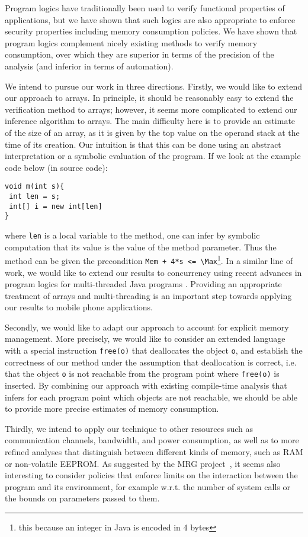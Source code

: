 
Program logics have traditionally been used to verify functional
properties of applications, but we have shown that such logics 
are also appropriate to enforce security properties including
memory consumption policies. We have shown that program logics
complement nicely existing methods to verify memory consumption,
over which they are superior in terms of the precision of the
analysis (and inferior in terms of automation).


We intend to pursue our work in three directions. Firstly, we would
like to extend our approach to arrays. In principle, it should be
reasonably easy to extend the verification method to arrays; however,
it seems more complicated to extend our inference algorithm to arrays.
The main difficulty here is to provide an estimate of the size of an
array, as it is given by the top value on the operand stack at the
time of its creation. Our intuition is that this can be done using
an abstract interpretation or a symbolic evaluation of the program. 
If we look at the example code below (in source code): 
\begin{lstlisting}[frame=trbl] 
void m(int s){
 int len = s;
 int[] i = new int[len]
} 
\end{lstlisting}
where \verb!len! is a local variable to the method, one can infer by
symbolic computation that its value is the value of the method
parameter. Thus the method can be given the precondition 
\lstinline{Mem + 4*s <= \Max}\footnote{this because an integer in Java is encoded in 4 bytes}.
 In a similar line of work, we would like to extend our
results to concurrency using recent advances in program logics for
multi-threaded Java programs \cite{RDFHL05ess}. Providing an appropriate
treatment of arrays and multi-threading is an important step towards
applying our results to mobile phone applications.



Secondly, we would like to adapt our approach to account for explicit
memory management. More precisely, we would like to consider an
extended language with a special instruction \texttt{free(o)} that
deallocates the object \texttt{o}, and establish the correctness of
our method under the assumption that deallocation is correct, i.e.
that the object \texttt{o} is not reachable from the program point
where \texttt{free(o)} is inserted. By combining our approach with
existing compile-time analysis that infers for each program point
which objects are not reachable, we should be able to provide more
precise estimates of memory consumption.




Thirdly, we intend to apply our technique to other resources such as
communication channels, bandwidth, and power consumption, as well as
to more refined analyses that distinguish between different kinds of
memory, such as RAM or non-volatile EEPROM.  As suggested by the MRG
project~\cite{asp+04:cassis}, it seems also interesting to consider
policies that enforce limits on the interaction between the program
and its environment, for example w.r.t. the number of system calls or
the bounds on parameters passed to them.




